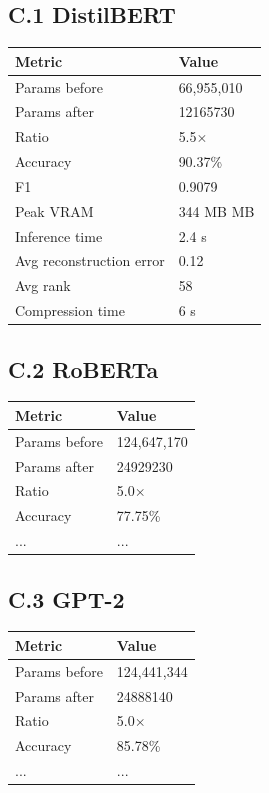 \subsection{C.1 DistilBERT}

\begin{table}[H]
\centering
\small
\begin{tabular}{ll}
\toprule
\textbf{Metric} & \textbf{Value} \\
\midrule
Params before & 66,955,010 \\
Params after & 12165730 \\
Ratio & 5.5$\times$ \\
Accuracy & 90.37\% \\
F1 & 0.9079 \\
Peak VRAM & 344 MB MB \\
Inference time & 2.4 s \\
Avg reconstruction error & 0.12 \\
Avg rank & 58 \\
Compression time & 6 s \\
\bottomrule
\end{tabular}
\end{table}

\subsection{C.2 RoBERTa}

\begin{table}[H]
\centering
\small
\begin{tabular}{ll}
\toprule
\textbf{Metric} & \textbf{Value} \\
\midrule
Params before & 124,647,170 \\
Params after & 24929230 \\
Ratio & 5.0$\times$ \\
Accuracy & 77.75\% \\
... & ... \\
\bottomrule
\end{tabular}
\end{table}

\subsection{C.3 GPT-2}

\begin{table}[H]
\centering
\small
\begin{tabular}{ll}
\toprule
\textbf{Metric} & \textbf{Value} \\
\midrule
Params before & 124,441,344 \\
Params after & 24888140 \\
Ratio & 5.0$\times$ \\
Accuracy & 85.78\% \\
... & ... \\
\bottomrule
\end{tabular}
\end{table}

